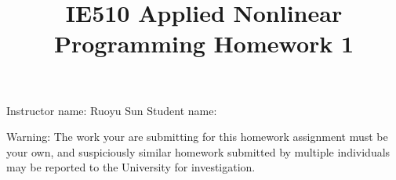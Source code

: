 \documentclass[11pt,letterpaper]{article}
\title{IE510 Applied Nonlinear Programming Homework 1}
\date{}
\begin{document}
\maketitle


\noindent Instructor name: Ruoyu Sun \hspace{1.8 in} Student name: \underline{\hspace{1.5in}} \\

%

\vspace*{0.3cm}

Warning: The work your are submitting for this homework assignment must be your own, and suspiciously similar homework submitted by multiple individuals may be reported to the University for investigation. 

\vspace{0.1 in}

%			
%
%
\end{document}

